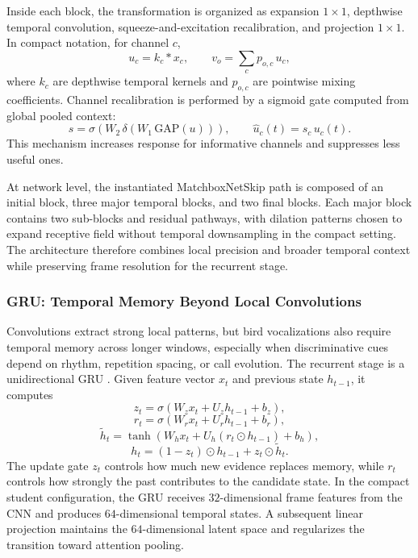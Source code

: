 \documentclass[a4paper,singleside,12pt]{report} %
\begin{document}
	Inside each block, the transformation is organized as expansion \(1\times1\), depthwise temporal convolution, squeeze-and-excitation recalibration, and projection \(1\times1\). In compact notation, for channel \(c\),
	\begin{equation}
		u_c = k_c * x_c, \qquad
		v_o = \sum_c p_{o,c}\,u_c,
	\end{equation}
	where \(k_c\) are depthwise temporal kernels and \(p_{o,c}\) are pointwise mixing coefficients. Channel recalibration is performed by a sigmoid gate computed from global pooled context:
	\begin{equation}
		s=\sigma\!\left(W_2\,\delta(W_1\,\mathrm{GAP}(u))\right), \qquad \hat{u}_c(t)=s_c\,u_c(t).
	\end{equation}
	This mechanism increases response for informative channels and suppresses less useful ones.

	At network level, the instantiated MatchboxNetSkip path is composed of an initial block, three major temporal blocks, and two final blocks. Each major block contains two sub-blocks and residual pathways, with dilation patterns chosen to expand receptive field without temporal downsampling in the compact setting. The architecture therefore combines local precision and broader temporal context while preserving frame resolution for the recurrent stage.

	\subsubsection{GRU: Temporal Memory Beyond Local Convolutions}
	Convolutions extract strong local patterns, but bird vocalizations also require temporal memory across longer windows, especially when discriminative cues depend on rhythm, repetition spacing, or call evolution. The recurrent stage is a unidirectional GRU \cite{cho2014gru}. Given feature vector \(x_t\) and previous state \(h_{t-1}\), it computes
	\begin{equation}
		z_t=\sigma(W_z x_t + U_z h_{t-1} + b_z),
	\end{equation}
	\begin{equation}
		r_t=\sigma(W_r x_t + U_r h_{t-1} + b_r),
	\end{equation}
	\begin{equation}
		\tilde{h}_t=\tanh(W_h x_t + U_h(r_t \odot h_{t-1}) + b_h),
	\end{equation}
	\begin{equation}
		h_t=(1-z_t)\odot h_{t-1} + z_t \odot \tilde{h}_t.
	\end{equation}
	The update gate \(z_t\) controls how much new evidence replaces memory, while \(r_t\) controls how strongly the past contributes to the candidate state. In the compact student configuration, the GRU receives \(32\)-dimensional frame features from the CNN and produces \(64\)-dimensional temporal states. A subsequent linear projection maintains the \(64\)-dimensional latent space and regularizes the transition toward attention pooling.
\end{document}
